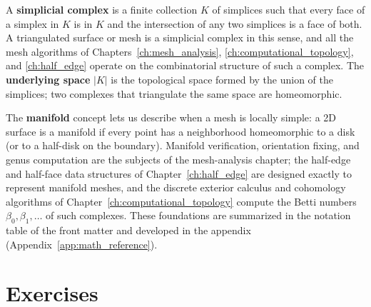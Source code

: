 A \textbf{simplicial complex} is a finite collection $K$ of simplices such
that every face of a simplex in $K$ is in $K$ and the intersection of any
two simplices is a face of both. A triangulated surface or mesh is a
simplicial complex in this sense, and all the mesh algorithms of
Chapters~\ref{ch:mesh_analysis}, \ref{ch:computational_topology}, and
\ref{ch:half_edge} operate on the combinatorial structure of such a
complex. The \textbf{underlying space} $|K|$ is the topological space formed
by the union of the simplices; two complexes that triangulate the same
space are homeomorphic.

The \textbf{manifold} concept lets us describe when a mesh is locally
simple: a 2D surface is a manifold if every point has a neighborhood
homeomorphic to a disk (or to a half-disk on the boundary). Manifold
verification, orientation fixing, and genus computation are the subjects of
the mesh-analysis chapter; the half-edge and half-face data structures of
Chapter~\ref{ch:half_edge} are designed exactly to represent manifold
meshes, and the discrete exterior calculus and cohomology algorithms of
Chapter~\ref{ch:computational_topology} compute the Betti numbers
$\beta_0,\beta_1,\dots$ of such complexes. These foundations are summarized
in the notation table of the front matter and developed in the appendix
(Appendix~\ref{app:math_reference}).


\section{Exercises}
\label{sec:math_exercises}

